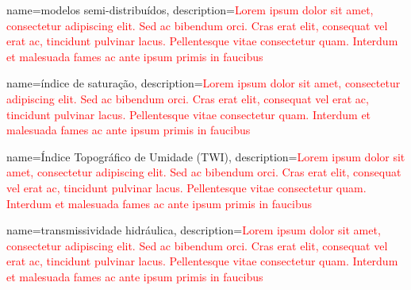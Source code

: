 {
	name=modelos semi-distribuídos,
	description={\textcolor{red}{Lorem ipsum dolor sit amet, consectetur adipiscing elit. Sed ac bibendum orci. Cras erat elit, consequat vel erat ac, tincidunt pulvinar lacus. Pellentesque vitae consectetur quam. Interdum et malesuada fames ac ante ipsum primis in faucibus}}
}

{
	name=índice de saturação,
	description={\textcolor{red}{Lorem ipsum dolor sit amet, consectetur adipiscing elit. Sed ac bibendum orci. Cras erat elit, consequat vel erat ac, tincidunt pulvinar lacus. Pellentesque vitae consectetur quam. Interdum et malesuada fames ac ante ipsum primis in faucibus}}
}

{
	name=Índice Topográfico de Umidade (TWI),
	description={\textcolor{red}{Lorem ipsum dolor sit amet, consectetur adipiscing elit. Sed ac bibendum orci. Cras erat elit, consequat vel erat ac, tincidunt pulvinar lacus. Pellentesque vitae consectetur quam. Interdum et malesuada fames ac ante ipsum primis in faucibus}}
}

{
	name=transmissividade hidráulica,
	description={\textcolor{red}{Lorem ipsum dolor sit amet, consectetur adipiscing elit. Sed ac bibendum orci. Cras erat elit, consequat vel erat ac, tincidunt pulvinar lacus. Pellentesque vitae consectetur quam. Interdum et malesuada fames ac ante ipsum primis in faucibus}}
}
